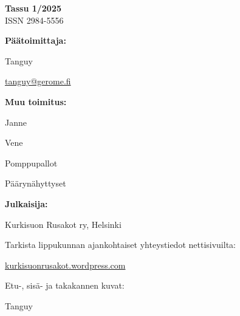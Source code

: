 \documentclass[10pt,finnish,a5paper]{scrartcl}
\begin{document}
{\color{white}
\noindent \textbf{Tassu 1/2025} \\
\noindent ISSN 2984-5556}

\vfill

\noindent\textbf{Päätoimittaja:}

Tanguy

\href{mailto:tanguy@gerome.fi}{tanguy@gerome.fi}

\medskip

\noindent\textbf{Muu toimitus:}

Janne

Vene

Pomppupallot

Päärynähyttyset

\medskip

\noindent\textbf{Julkaisija:}

Kurkisuon Rusakot ry, Helsinki

\medskip

\noindent Tarkista lippukunnan ajankohtaiset yhteystiedot nettisivuilta:

\href{https://kurkisuonrusakot.wordpress.com/}{kurkisuonrusakot.wordpress.com}

\medskip

\noindent Etu-, sisä- ja takakannen kuvat:

Tanguy

\vspace{-0.64cm}

\tableofcontents
















% 
\end{document}
